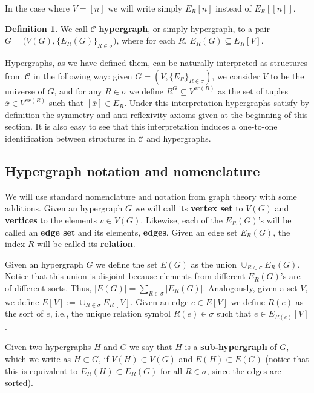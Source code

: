 \documentclass[12pt,notitlepage,a4paper]{article}
\theoremstyle{definition}
\newtheorem{definition}{Definition}[section]
\begin{document}
In the case where $V=[n]$ we will write simply $E_R[n]$ instead
of $E_R[[n]]$.

\begin{definition} 
We call $\mathcal{C}$-\textbf{hypergraph}, or simply hypergraph, 
to a pair $G=\Big(V(G),\{E_R(G)\}_{R\in\sigma}\Big)$,
where for each $R$, $E_R(G) \subseteq E_R[V]$.
\end{definition}

Hypergraphs, as we have defined them, 
can be naturally interpreted as
structures from $\mathcal{C}$ 
in the following way: 
given $G=(V,\{E_R\}_{R\in \sigma})$,
we consider $V$ to be the universe of
 $G$, and for any $R\in \sigma$ we define
$R^G\subseteq V^{ar(R)}$ as the set of tuples
$\overline{x}\in V^{ar(R)}$ such that
$[\overline{x}]\in E_R$. Under 
this interpretation hypergraphs
satisfy by definition the 
symmetry and anti-reflexivity
axioms given at the beginning of this section. It is also easy to
see that this interpretation induces
a one-to-one identification between 
structures in $\mathcal{C}$ and hypergraphs. \par

\subsection{Hypergraph notation and nomenclature}

We will use standard nomenclature and notation
from graph theory with some additions. Given an 
hypergraph $G$ we will call its \textbf{vertex set} to $V(G)$ 
and \textbf{vertices} 
to the elements $v\in V(G)$. Likewise, each of 
the $E_R(G)$'s will be called an \textbf{edge set} and its elements, 
\textbf{edges}. Given an edge set $E_R(G)$, 
the index $R$ will be called its \textbf{relation}. 

\par
Given an hypergraph $G$ we define the set $E(G)$ as the
union $\cup_{R\in \sigma}E_R(G)$. Notice that this union 
is disjoint because elements from different $E_R(G)$'s 
are of different sorts. Thus, $|E(G)|=\sum_{R\in \sigma} 
|E_R(G)|$. Analogously, given a set $V$, we define
$E[V]:=\cup_{R\in \sigma} E_R[V]$.
Given an edge $e\in E[V]$ we define $R(e)$
as the sort of $e$, i.e.,
the unique relation symbol $R(e)\in \sigma$
such that $e\in E_{R(e)}[V]$.

Given two hypergraphs $H$ and $G$ we say that $H$
is a \textbf{sub-hypergraph} of $G$, which we write as $H\subset G$,
if $V(H)\subset V(G)$ and $E(H)\subset E(G)$ (notice 
that this is equivalent to $E_R(H)\subset E_R(G)$ for all
$R\in \sigma$, since the edges are sorted).\par
\end{document}
